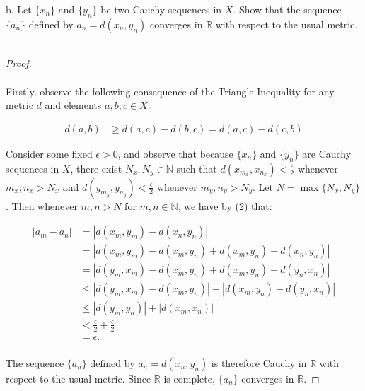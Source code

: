     \pagebreak

b.  Let $\{x_n\}$ and $\{y_n\}$ be two Cauchy sequences in $X$. Show that the
    sequence $\{a_n\}$ defined by $a_n = d(x_n, y_n)$ converges in $\mathbb{R}$ with respect to the usual metric.
    \ \\

    \begin{proof}\ \\\\
        Firstly, observe the following consequence of the Triangle Inequality for any metric $d$ and elements
        $a, b, c \in X$:

        \begin{align}
            d(a, b) &\ge d(a, c) - d(b, c) = d(a, c) - d(c, b)
        \end{align}


        Consider some fixed $\epsilon > 0$, and observe that because $\{x_n\}$ and $\{y_n\}$ are Cauchy sequences in 
        $X$, there exist $N_x, N_y \in \mathbb{N}$
        such that $d(x_{m_x}, x_{n_x}) < \frac{\epsilon}{2}$ whenever $m_x,n_x > N_x$ and
        $d(y_{m_y}, y_{n_y}) < \frac{\epsilon}{2}$ whenever $m_y,n_y > N_y$. Let $N = \max{\{N_x, N_y\}}$. Then whenever
        $m, n > N$ for $m, n \in \mathbb{N}$, we have by (2) that:

        \begin{align*}
            |a_m - a_n| &= |d(x_m, y_m) - d(x_n, y_n)| \\
                        &= |d(x_m, y_m) - d(x_m, y_n) + d(x_m, y_n) - d(x_n, y_n)| \\
                        &= |d(y_m, x_m) - d(x_m, y_n) + d(x_m, y_n) - d(y_n, x_n)| \\
                        &\le |d(y_m, x_m) - d(x_m, y_n)| + |d(x_m, y_n) - d(y_n, x_n)| \\
                        &\le |d(y_m, y_n)| + |d(x_m, x_n)| \\
                        &< \frac{\epsilon}{2} + \frac{\epsilon}{2} \\
                        &= \epsilon. \\
        \end{align*}

        The sequence $\{a_n\}$ defined by $a_n = d(x_n, y_n)$ is therefore Cauchy in $\mathbb{R}$ with respect to the
        usual metric. Since $\mathbb{R}$ is complete, $\{a_n\}$ converges in $\mathbb{R}$.

    \end{proof}

    \pagebreak
